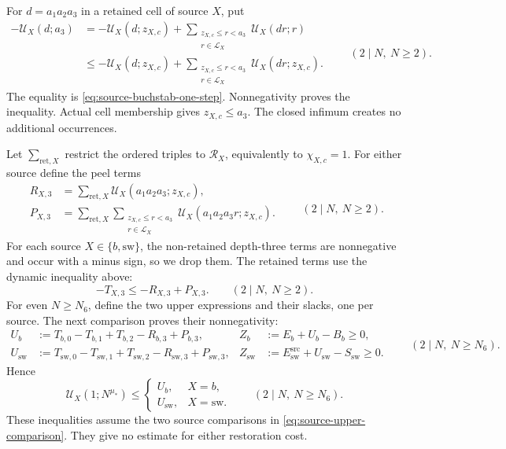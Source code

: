 For \(d=a_1a_2a_3\) in a retained cell of
source \(X\), put
\begin{equation}\label{eq:source-dynamic-cutoff}
\begin{aligned}
 -\mathscr U_X(d;a_3)
 &= -\mathscr U_X(d;z_{X,c})+
       \sum_{\substack{z_{X,c}\le r<a_3\\r\in\mathscr L_X}}\mathscr U_X(dr;r)\\
 &\le-\mathscr U_X(d;z_{X,c})+
       \sum_{\substack{z_{X,c}\le r<a_3\\r\in\mathscr L_X}}\mathscr U_X(dr;z_{X,c}).
\end{aligned}
\qquad(2\mid N,\ N\ge2).
\end{equation}
The equality is \eqref{eq:source-buchstab-one-step}.
Nonnegativity proves the inequality.
Actual cell membership gives \(z_{X,c}\le a_3\).
The closed infimum creates no additional occurrences.

Let \(\sum_{\mathrm{ret},X}\) restrict the ordered triples to
\(\mathcal R_X\), equivalently to \(\chi_{X,c}=1\). For either source define
the peel terms
\begin{equation}\label{eq:source-base-peel}
\begin{aligned}
 R_{X,3}&=\sum_{\mathrm{ret},X}\mathscr U_X(a_1a_2a_3;z_{X,c}),\\
 P_{X,3}&=\sum_{\mathrm{ret},X}
       \sum_{\substack{z_{X,c}\le r<a_3\\r\in\mathscr L_X}}
             \mathscr U_X(a_1a_2a_3r;z_{X,c}).
\end{aligned}
\qquad(2\mid N,\ N\ge2).
\end{equation}
For each source \(X\in\{b,\mathrm{sw}\}\), the non-retained depth-three
terms are nonnegative and occur with a minus sign, so we drop them.
The retained terms use the dynamic inequality above:
\begin{equation}\label{eq:source-nonretained-drop}
 -T_{X,3}\le -R_{X,3}+P_{X,3}.
\qquad(2\mid N,\ N\ge2).
\end{equation}
For even \(N\ge N_6\), define the two upper expressions and their
slacks, one per source. The next comparison proves their nonnegativity:
\begin{equation}\label{eq:source-upper-slack}
 \begin{aligned}
 U_b&:=T_{b,0}-T_{b,1}+T_{b,2}-R_{b,3}+P_{b,3},&
 Z_b&:=E_b+U_b-B_b\ge0,\\
 U_{\mathrm{sw}}&:=T_{\mathrm{sw},0}-T_{\mathrm{sw},1}
       +T_{\mathrm{sw},2}-R_{\mathrm{sw},3}+P_{\mathrm{sw},3},&
 Z_{\mathrm{sw}}&:=E_{\mathrm{sw}}^{\mathrm{src}}
       +U_{\mathrm{sw}}-S_{\mathrm{sw}}\ge0.
 \end{aligned}
 \qquad(2\mid N,\ N\ge N_6).
\end{equation}
Hence
\begin{equation}\label{eq:source-sifted-upper}
 \mathscr U_X(1;N^{\mu_*})\le
 \begin{cases}
 U_b,&X=b,\\
 U_{\mathrm{sw}},&X=\mathrm{sw}.
 \end{cases}
\qquad(2\mid N,\ N\ge N_6).
\end{equation}
These inequalities assume the two source comparisons in
\eqref{eq:source-upper-comparison}. They give no estimate for either
restoration cost.

